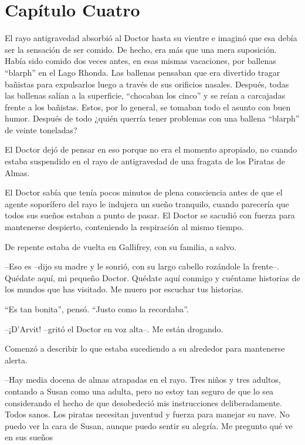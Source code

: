\chapter*{Capítulo Cuatro}

El rayo antigravedad absorbió al Doctor hasta su vientre e imaginó que esa debía ser la sensación de ser comido. De hecho, era más que una mera suposición. Había sido comido dos veces antes, en esas mismas vacaciones, por ballenas ``blarph'' en el Lago Rhonda. Las ballenas pensaban que era divertido tragar bañistas para expulsarlos luego a través de sus orificios nasales. Después, todas las ballenas salían a la superficie, ``chocaban los cinco'' y se reían a carcajadas frente a los bañistas. Estos, por lo general, se tomaban todo el asunto con buen humor. Después de todo ¿quién querría tener problemas con una ballena ``blarph'' de veinte toneladas?

El Doctor dejó de pensar en eso porque no era el momento apropiado, no cuando estaba suspendido en el rayo de antigravedad de una fragata de los Piratas de Almas.

El Doctor sabía que tenía pocos minutos de plena consciencia antes de que el agente soporífero del rayo le indujera un sueño tranquilo, cuando parecería que todos sus sueños estaban a punto de pasar. El Doctor se sacudió con fuerza para mantenerse despierto, conteniendo la respiración al mismo tiempo.

De repente estaba de vuelta en Gallifrey, con su familia, a salvo.

--Eso es --dijo su madre y le sonrió, con su largo cabello rozándole la frente--. Quédate aquí, mi pequeño Doctor. Quédate aquí conmigo y cuéntame historias de los mundos que has visitado. Me muero por escuchar tus historias.

``Es tan bonita'', pensó. ``Justo como la recordaba''.

--¡D'Arvit! --gritó el Doctor en voz alta--. Me están drogando. 

Comenzó a describir lo que estaba sucediendo a su alrededor para mantenerse alerta.

--Hay media docena de almas atrapadas en el rayo. Tres niños y tres adultos, contando a Susan como una adulta, pero no estoy tan seguro de que lo sea considerando el hecho de que desobedeció mis instrucciones deliberadamente. Todos sanos. Los piratas necesitan juventud y fuerza para manejar su nave. No puedo ver la cara de Susan, aunque puedo sentir su alegría. Me pregunto qué ve en sus sueños

